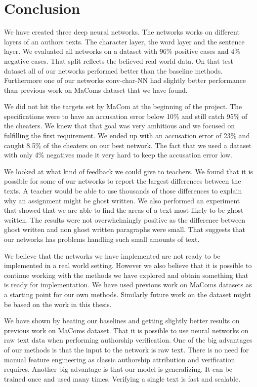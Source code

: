 \section{Conclusion} \label{sec:conclusion}

We have created three deep neural networks. The networks works on different
layers of an authors texts. The character layer, the word layer and the sentence
layer. We evaluated all networks on a dataset with 96\% positive cases and
4\% negative cases. That split reflects the believed real world data. On
that test dataset all of our networks performed better than the baseline
methods. Furthermore one of our networks \gls{conv-char-NN} had slightly better
performance than previous work on MaComs dataset that we have found.

We did not hit the targets set by MaCom at the beginning of the project. The
specifications were to have an accusation error below 10\% and still catch 95\%
of the cheaters. We knew that that goal was very ambitious and we focused on
fulfilling the first requirement. We ended up with an accusation error of 23\%
and caught 8.5\% of the cheaters on our best network. The fact that we used a
dataset with only 4\% negatives made it very hard to keep the accusation error
low.

We looked at what kind of feedback we could give to teachers. We found that it
is possible for some of our networks to report the largest differences between
the texts. A teacher would be able to use thousands of those differences
to explain why an assignment might be ghost written. We also performed an
experiment that showed that we are able to find the areas of a text most likely
to be ghost written. The results were not overwhelmingly positive as the
difference between ghost written and non ghost written paragraphs were small.
That suggests that our networks has problems handling such small amounts of
text.

We believe that the networks we have implemented are not ready to be implemented
in a real world setting. However we also believe that it is possible to continue
working with the methods we have explored and obtain something that is ready for
implementation. We have used previous work on MaComs datasets as a starting
point for our own methods. Similarly future work on the dataset might be based
on the work in this thesis.

We have shown by beating our baselines and getting slightly better results on
previous work on MaComs dataset. That it is possible to use neural networks
on raw text data when performing authorship verification. One of the big
advantages of our methods is that the input to the network is raw text. There
is no need for manual feature engineering as classic authorship attribution and
verification requires. Another big advantage is that our model is generalizing.
It can be trained once and used many times. Verifying a single text is fast and
scalable.
